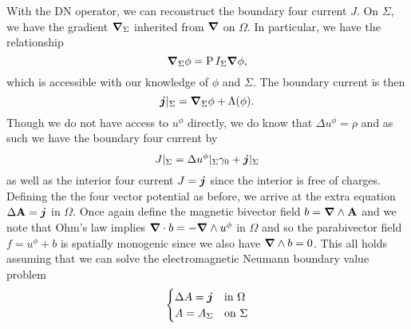 With the DN operator, we can reconstruct the boundary four current $J$.  On $\Sigma$, we have the gradient $\boldsymbol{\nabla}_\Sigma$ inherited from $\boldsymbol{\nabla}$ on $\Omega$.  In particular, we have the relationship
\[
\boldsymbol{\nabla}_\Sigma \phi = \operatorname{P}{I_\Sigma}{\boldsymbol{\nabla} \phi},
\]
which is accessible with our knowledge of $\phi$ and $\Sigma$. The boundary current is then
\[
\boldsymbol{j}\vert_{\Sigma} = \boldsymbol{\nabla}_\Sigma \phi + \Lambda(\phi).
\]
Though we do not have access to $u^\phi$ directly, we do know that $\Delta u^\phi = \rho$ and as such we have the boundary four current by
\[
J\vert_\Sigma = \Delta u^\phi\vert_\Sigma \gamma_0 + \boldsymbol{j}\vert_\Sigma
\]
as well as the interior four current $J = \boldsymbol{j}$ since the interior is free of charges.  Defining the the four vector potential as before, we arrive at the extra equation $\Delta \mathbf{A} = \boldsymbol{j}$ in $\Omega$. Once again define the magnetic bivector field $b=\boldsymbol{\nabla} \wedge \mathbf{A}$ and we note that Ohm's law implies $\boldsymbol{\nabla} \cdot b = -\boldsymbol{\nabla} \wedge u^\phi$ in $\Omega$ and so the parabivector field $f=u^\phi + b$ is spatially monogenic since we also have $\boldsymbol{\nabla} \wedge b = 0$.  This all holds assuming that we can solve the electromagnetic Neumann boundary value problem
\[
\begin{cases} \Delta A = \boldsymbol{j} & \textrm{in $\Omega$}\\ A = A_\Sigma & \textrm{on $\Sigma$} \end{cases}
\]


